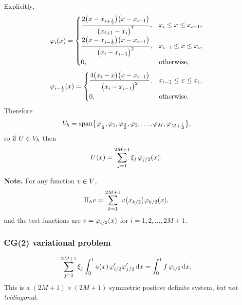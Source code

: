 Explicitly,
\begin{equation}\label{eq:l10phii}
  \varphi_{i}(x)=
  \begin{cases}
    \dfrac{2\bigl(x-x_{i+\frac12}\bigr)\bigl(x-x_{i+1}\bigr)}
          {\bigl(x_{i+1}-x_{i}\bigr)^{2}}, & x_{i}\le x\le x_{i+1},\\[2.2ex]
    \dfrac{2\bigl(x-x_{i-\frac12}\bigr)\bigl(x-x_{i-1}\bigr)}
          {\bigl(x_{i}-x_{i-1}\bigr)^{2}}, & x_{i-1}\le x\le x_{i},\\[2.2ex]
    0, & \text{otherwise,}
  \end{cases}
\end{equation}
\begin{equation}\label{eq:l10phihalf}
  \varphi_{i-\frac12}(x)=
  \begin{cases}
    \dfrac{4\bigl(x_{i}-x\bigr)\bigl(x-x_{i-1}\bigr)}
          {\bigl(x_{i}-x_{i-1}\bigr)^{2}}, & x_{i-1}\le x\le x_{i},\\[2.2ex]
    0, & \text{otherwise.}
  \end{cases}
\end{equation}
Therefore
\begin{equation}\label{eq:l10span}
  V_{h}=\operatorname{span}\bigl\{\varphi_{\frac12},\varphi_{1},\varphi_{\frac32},
      \varphi_{2},\dots,\varphi_{M},\varphi_{M+\frac12}\bigr\},
\end{equation}
so if $U\in V_{h}$ then
\begin{equation}\label{eq:l10U}
  U(x)=\sum_{j=1}^{2M+1}\xi_{j}\,\varphi_{j/2}(x).
\end{equation}

\medskip\noindent
\textbf{Note.} For any function $v\in V$,
\begin{equation}\label{eq:l10interp}
  \Pi_h v=\sum_{k=1}^{2M+1}v\bigl(x_{k/2}\bigr)\varphi_{k/2}(x),
\end{equation}
and the test functions are $v=\varphi_{i/2}(x)$ for $i=1,2,\dots,2M+1$.

\subsubsection*{CG(2) variational problem}

\begin{equation}\label{eq:l10cg2var}
  \sum_{j=1}^{2M+1}\xi_{j}\int_0^1 a(x)\,\varphi'_{i/2}\varphi'_{j/2}\,\mathrm{d} x
  =\int_0^1 f\,\varphi_{i/2}\,\mathrm{d} x .
\end{equation}
This is a $(2M+1)\times(2M+1)$ symmetric positive definite system, \emph{but not
tridiagonal}.

